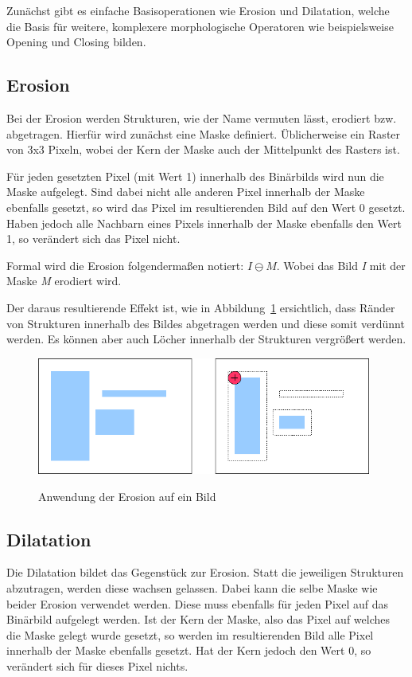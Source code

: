 Zunächst gibt es einfache Basisoperationen wie Erosion und Dilatation, welche die Basis für weitere, komplexere morphologische Operatoren wie beispielsweise Opening und Closing bilden.

\subsection{Erosion}
Bei der Erosion werden Strukturen, wie der Name vermuten lässt, erodiert bzw. abgetragen.
Hierfür wird zunächst eine Maske definiert. Üblicherweise ein Raster von 3x3 Pixeln, wobei der Kern der Maske auch der Mittelpunkt des Rasters ist.

Für jeden gesetzten Pixel (mit Wert 1) innerhalb des Binärbilds wird nun die Maske aufgelegt. Sind dabei nicht alle anderen Pixel innerhalb der Maske ebenfalls gesetzt, so wird das Pixel im resultierenden Bild auf den Wert 0 gesetzt.
Haben jedoch alle Nachbarn eines Pixels innerhalb der Maske ebenfalls den Wert 1, so verändert sich das Pixel nicht.

Formal wird die Erosion folgendermaßen notiert: $ I \ominus M $. Wobei das Bild {\em I} mit der Maske {\em M} erodiert wird.

Der daraus resultierende Effekt ist, wie in Abbildung~\ref{fig:Erosion} ersichtlich, dass Ränder von Strukturen innerhalb des Bildes abgetragen werden und diese somit verdünnt werden. Es können aber auch Löcher innerhalb der Strukturen vergrößert werden.

\begin{figure}[ht]
   \centering
     \includegraphics[width=11cm]{Bilder/MorphologicalErosion} \\
 \caption{Anwendung der Erosion auf ein Bild}
 \label{fig:Erosion}
\end{figure}

\subsection{Dilatation}
Die Dilatation bildet das Gegenstück zur Erosion. Statt die jeweiligen Strukturen abzutragen, werden diese wachsen gelassen.
Dabei kann die selbe Maske wie beider Erosion verwendet werden. Diese muss ebenfalls für jeden Pixel auf das Binärbild aufgelegt werden. Ist der Kern der Maske, also das Pixel auf welches die Maske gelegt wurde gesetzt, so werden im resultierenden Bild alle Pixel innerhalb der Maske ebenfalls gesetzt. Hat der Kern jedoch den
Wert 0, so verändert sich für dieses Pixel nichts.

